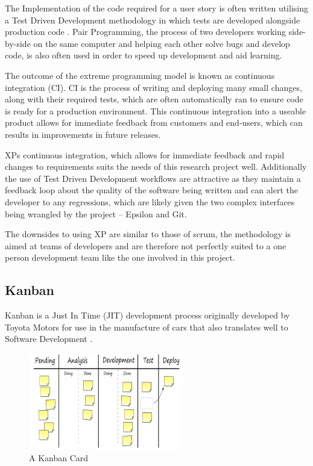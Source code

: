 \documentclass[11pt]{book}
\begin{document}
The Implementation of the code required for a user story is often written utilising a Test Driven Development methodology in which tests are developed alongside production code \cite{tddxp}. Pair Programming, the process of two developers working side-by-side on the same computer and helping each other solve bugs and develop code, is also often used in order to speed up development and aid learning.

The outcome of the extreme programming model is known as continuous integration (CI). CI is the process of writing and deploying many small changes, along with their required tests, which are often automatically ran to ensure code is ready for a production environment. This continuous integration into a useable product allows for immediate feedback from customers and end-users, which can results in improvements in future releases.

XPs continuous integration, which allows for immediate feedback and rapid changes to requirements suits the needs of this research project well. Additionally the use of Test Driven Development workflows are attractive as they maintain a feedback loop about the quality of the software being written and can alert the developer to any regressions, which are likely given the two complex interfaces being wrangled by the project -- Epsilon and Git.

The downsides to using XP are similar to those of scrum, the methodology is aimed at teams of developers and are therefore not perfectly suited to a one person development team like the one involved in this project.

\subsection{Kanban}
Kanban is a Just In Time (JIT) development process originally developed by Toyota Motors for use in the manufacture of cars that also translates well to Software Development \cite{toyota}.

\begin{figure}[H]
	\centering
	\includegraphics[width=0.6\textwidth]{images/kanban}
	\caption{A Kanban Card \cite{kanbandiagram}}
	\label{fig:kanban}
\end{figure}
\end{document}
